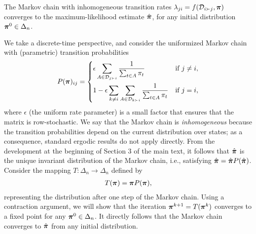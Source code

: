 \begin{theorem}
\label{thm:convergence}
The Markov chain with inhomogeneous transition rates $\lambda_{ji} = f(\mathcal{D}_{i \succ j}, \bm{\pi})$ converges to the maximum-likelihood estimate $\hat{\bm{\pi}}$, for any initial distribution $\bm{\pi}^0 \in \Delta_n$.
\end{theorem}

We take a discrete-time perspective, and consider the uniformized Markov chain with (parametric) transition probabilities
\begin{align}
  P(\bm{\pi})_{ij} =
  \begin{dcases}
    \epsilon \sum_{A \in \mathcal{D}_{j \succ i}} \frac{1}{\sum_{t \in A} \pi_t}              & \text{if } j \ne i, \\
    1 - \epsilon \sum_{k \ne i}\sum_{A \in \mathcal{D}_{k \succ i}} \frac{1}{\sum_{t \in A} \pi_t}  & \text{if } j = i,
  \end{dcases}
\end{align}
where $\epsilon$ (the uniform rate parameter) is a small factor that ensures that the matrix is row-stochastic.
We say that the Markov chain is \emph{inhomogeneous} because the transition probabilities depend on the current distribution over states;
as a consequence, standard ergodic results do not apply directly.
From the development at the beginning of Section 3 of the main text, it follows that $\hat{\bm{\pi}}$ is the unique invariant distribution of the Markov chain, i.e., satisfying $\hat{\bm{\pi}} = \hat{\bm{\pi}} P(\hat{\bm{\pi}})$.
Consider the mapping $T: \Delta_n \to \Delta_n$ defined by
\begin{align}
\label{eq:mapping}
T(\bm{\pi}) = \bm{\pi} P(\bm{\pi}),
\end{align}
representing the distribution after one step of the Markov chain.
Using a contraction argument, we will show that the iteration $\bm{\pi}^{k+1} = T(\bm{\pi}^k)$ converges to a fixed point for any $\bm{\pi}^0 \in \Delta_n$.
It directly follows that the Markov chain converges to $\hat{\bm{\pi}}$ from any initial distribution.

